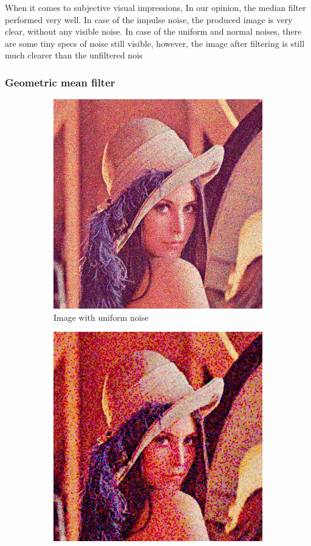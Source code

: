 \documentclass[12pt]{article}
\theoremstyle{definition}
\begin{document}
When it comes to subjective visual impressions,
In our opinion, the median filter performed very well.
In case of the impulse noise, the produced image is very clear, without any visible noise.
In case of the uniform and normal noises, there are some tiny specs of noise still visible,
however, the image after filtering is still much clearer than the unfiltered nois

\clearpage
\subsubsection{Geometric mean filter}

\begin{figure}[ht]\centering
    \begin{subfigure}[t]{.4\textwidth}\centering
        \includegraphics[width=.8\textwidth]{lenac_uniform3}
        \caption{Image with uniform noise}
    \end{subfigure}
    \begin{subfigure}[t]{.4\textwidth}\centering
        \includegraphics[width=.8\textwidth]{lenac_uniform_gmean}

\end{subfigure}
\end{figure}
\end{document}

